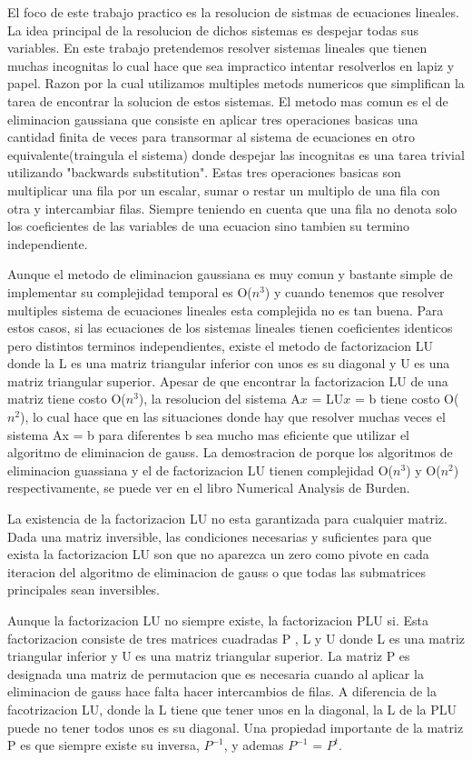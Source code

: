 El foco de este trabajo practico es la resolucion de sistmas de ecuaciones lineales. La idea principal de la resolucion de dichos sistemas es despejar todas sus variables. En este trabajo pretendemos resolver sistemas lineales que tienen muchas incognitas lo cual hace que sea impractico intentar resolverlos en lapiz y papel. Razon por la cual utilizamos multiples metods numericos que simplifican la tarea de encontrar la solucion de estos sistemas. El metodo mas comun es el de eliminacion gaussiana que consiste en aplicar tres operaciones basicas una cantidad finita de veces para transormar al sistema de ecuaciones en otro equivalente(traingula el sistema) donde despejar las incognitas es una tarea trivial utilizando "backwards substitution". Estas tres operaciones basicas son multiplicar una fila por un escalar, sumar o restar un multiplo de una fila con otra y intercambiar filas. Siempre teniendo en cuenta que una fila no denota solo los coeficientes de las variables de una ecuacion sino tambien su termino independiente.\par
\indent Aunque el metodo de eliminacion gaussiana es muy comun y bastante simple de implementar su complejidad temporal es O($n^{3}$) y cuando tenemos que resolver multiples sistema de ecuaciones lineales esta complejida no es tan buena. Para estos casos, si las ecuaciones de los sistemas lineales tienen coeficientes identicos pero distintos terminos independientes, existe el metodo de factorizacion LU donde la L es una matriz triangular inferior con unos es su diagonal y U es una matriz triangular superior. Apesar de que encontrar la factorizacion LU de una matriz tiene costo O($n^{3}$), la resolucion del sistema A$x$ = LU$x$ = b tiene costo O($n^{2}$), lo cual hace que en las situaciones donde hay que resolver muchas veces el sistema Ax = b para diferentes b sea mucho mas eficiente que utilizar el algoritmo de eliminacion de gauss. La demostracion de porque los algoritmos de eliminacion guassiana y el de factorizacion LU tienen complejidad O($n^{3}$) y O($n^{2}$) respectivamente, se puede ver en el libro Numerical Analysis de Burden. \par
\indent La existencia de la factorizacion LU no esta garantizada para cualquier matriz. Dada una matriz inversible, las condiciones necesarias y suficientes para que exista la factorizacion LU son que no aparezca un zero como pivote en cada iteracion del algoritmo de eliminacion de gauss o que todas las submatrices principales sean inversibles.\par
Aunque la factorizacion LU no siempre existe, la factorizacion PLU si. Esta factorizacion consiste de tres matrices cuadradas P , L y U donde L es una matriz triangular inferior y U es  una matriz triangular superior.  La matriz P es designada una matriz de permutacion que es necesaria cuando al aplicar la eliminacion de gauss hace falta hacer intercambios de filas. A diferencia de la facotrizacion LU, donde la L tiene que tener unos en la diagonal, la L de la PLU puede no tener todos unos es su diagonal. Una propiedad importante de la matriz P es que siempre existe su inversa, $P^{-1}$, y ademas $P^{-1}$ = $P^{t}$. \par
